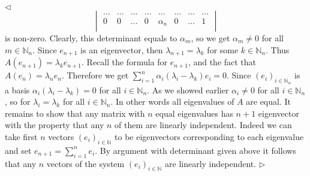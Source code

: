 \documentclass[12pt]{article}
\newenvironment{solution}{\par $\triangleleft$}{$\triangleright$}
\begin{document}
\begin{solution}
$$\begin{vmatrix}
            \ldots       &
            \ldots       &
            \ldots       &
            \ldots       &
            \ldots       &
            \ldots       &
            \ldots       &
            \ldots           \\
            0            &
            0            &
            \ldots       &
            0            &
            \alpha_n     &
            0            &
            \ldots       &
            1                \\
        \end{vmatrix}
    $$
    is non-zero. Clearly, this determinant equals to $\alpha_m$, so we get
    $\alpha_m\neq 0$ for all $m\in\mathbb{N}_n$. Since $e_{n+1}$ is an
    eigenvector, then $\lambda_{n+1}=\lambda_k$ for some $k\in\mathbb{N}_n$.
    Thus $A(e_{n+1})=\lambda_k e_{n+1}$. Recall the formula for $e_{n+1}$, and
    the fact that $A(e_n)=\lambda_n e_n$. Therefore we get
    $\sum_{i=1}^n\alpha_i(\lambda_i-\lambda_k)e_i=0$. Since
    ${(e_i)}_{i\in\mathbb{N}_n}$ is a basis $\alpha_i(\lambda_i-\lambda_k)=0$
    for all $i\in\mathbb{N}_n$. As we showed earlier $\alpha_i\neq 0$ for all
    $i\in\mathbb{N}_n$, so for $\lambda_i=\lambda_k$ for all $i\in\mathbb{N}_n$.
    In other words all eigenvalues of $A$ are equal. It remains to show that any
    matrix with $n$ equal eigenvalues has $n+1$ eigenvector with the property
    that any $n$ of them are linearly independent. Indeed we can take first $n$
    vectors ${(e_i)}_{i\in\mathbb{N}}$ to be eigenvectors corresponding to each
    eigenvalue and set $e_{n+1}=\sum_{i=1}^n e_i$. By argument with determinant
    given above it follows that any $n$ vectors of the system
    ${(e_i)}_{i\in\mathbb{N}}$ are linearly independent.
\end{solution}
\end{document}
